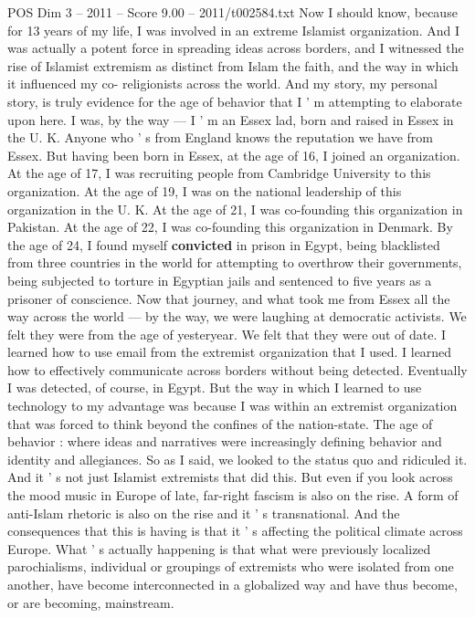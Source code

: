 \begin{textsample}{POS Dim 3 – 2011 – Score 9.00 – 2011/t002584.txt}
Now I should know, because for 13 years of my life, I was involved in an extreme Islamist organization.
And I was actually a potent force in spreading ideas across borders, and I witnessed the rise of Islamist extremism as distinct from Islam the faith, and the way in which it influenced my co- religionists across the world.
And my story, my personal story, is truly evidence for the age of behavior that I ' m attempting to elaborate upon here.
I was, by the way — I ' m an Essex lad, born and raised in Essex in the U.
K.
Anyone who ' s from England knows the reputation we have from Essex.
But having been born in Essex, at the age of 16, I joined an organization.
At the age of 17, I was recruiting people from Cambridge University to this organization.
At the age of 19, I was on the national leadership of this organization in the U.
K.
At the age of 21, I was co-founding this organization in Pakistan.
At the age of 22, I was co-founding this organization in Denmark.
By the age of 24, I found myself \textbf{convicted} in prison in Egypt, being blacklisted from three countries in the world for attempting to overthrow their governments, being subjected to torture in Egyptian jails and sentenced to five years as a prisoner of conscience.
Now that journey, and what took me from Essex all the way across the world — by the way, we were laughing at democratic activists.
We felt they were from the age of yesteryear.
We felt that they were out of date.
I learned how to use email from the extremist organization that I used.
I learned how to effectively communicate across borders without being detected.
Eventually I was detected, of course, in Egypt.
But the way in which I learned to use technology to my advantage was because I was within an extremist organization that was forced to think beyond the confines of the nation-state.
The age of behavior : where ideas and narratives were increasingly defining behavior and identity and allegiances.
So as I said, we looked to the status quo and ridiculed it.
And it ' s not just Islamist extremists that did this.
But even if you look across the mood music in Europe of late, far-right fascism is also on the rise.
A form of anti-Islam rhetoric is also on the rise and it ' s transnational.
And the consequences that this is having is that it ' s affecting the political climate across Europe.
What ' s actually happening is that what were previously localized parochialisms, individual or groupings of extremists who were isolated from one another, have become interconnected in a globalized way and have thus become, or are becoming, mainstream.

\end{textsample}
